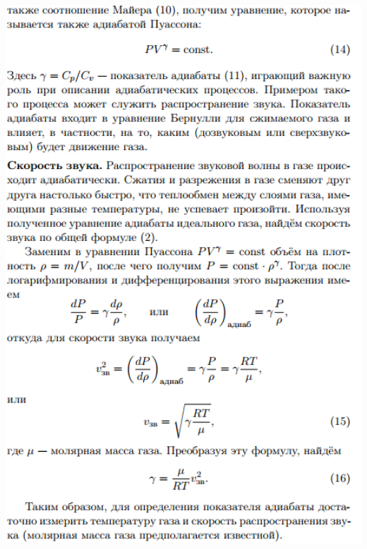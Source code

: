 \documentclass[12pt]{article}
\begin{document}
\begin{center}
    	\includegraphics[width=16cm]{theory_5.png}

\end{center}
\end{document}
